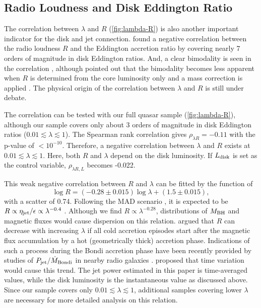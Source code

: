 \documentclass[preprint2,twocolappendix]{aastex6}
\begin{document}
\subsection{Radio Loudness and Disk Eddington Ratio}
\label{sec:R-lambda}

The correlation between $\lambda$ and $R$ (\autoref{fig:lambda-R}) is also another important indicator for the disk and jet connection. 
\citet{sik07} found a negative correlation between the radio loudness $R$ and the Eddington accretion ratio by covering nearly 7 orders of magnitude in disk Eddington ratios. And, a clear bimodality is seen in the correlation \citep{sik07}, although \citet{bro11} pointed out that the bimodality becomes less apparent when $R$ is determined from the core luminosity only and a mass correction is applied \citep[see also][]{gar14}. The physical origin of the correlation between $\lambda$ and $R$ is still under debate. 

The correlation can be tested with our full quasar sample (\autoref{fig:lambda-R}), although our sample covers only about 3 orders of magnitude in disk Eddington ratios ($0.01\lesssim\lambda\lesssim1$). The Spearman rank correlation gives $\rho_{\lambda R}=-0.11$ with the p-value of $<10^{-10}$. Therefore, a negative correlation between $\lambda$ and $R$ exists at $0.01\lesssim\lambda\lesssim1$. Here, both $R$ and $\lambda$ depend on the disk luminosity. If $L_{\rm disk}$ is set as the control variable, $\rho_{\lambda R, L}$ becomes -0.022. 

This weak negative correlation between $R$ and $\lambda$ can be fitted by the function of
\begin{equation}
\log R = (-0.28\pm0.015) \log \lambda + (1.5 \pm 0.015),
\end{equation}
with a scatter of 0.74. Following the MAD scenario \citep{nar03}, it is expected to be $R\propto \eta_{\rm jet}/\epsilon\propto\lambda^{-0.4}$ \citep{sik13}. Although we find $R\propto\lambda^{-0.28}$, distributions of $M_{\rm BH}$ and magnetic fluxes would cause dispersion on this relation. \citet{sik13} argued that $R$ can decrease with increasing $\lambda$ if all cold accretion episodes start after the magnetic flux accumulation by a hot (geometrically thick) accretion phase. Indications of such a process during the Bondi accretion phase have been recently provided by studies of $P_{\rm jet}/\dot{M}_{\rm Bondi}$ in nearby radio galaxies \citep{nem15}. \citet{rus16} proposed that time variation would cause this trend. The jet power estimated in this paper is time-averaged values, while the disk luminosity is the instantaneous value as discussed above. Since our sample covers only $0.01\lesssim\lambda\lesssim1$, additional samples covering lower $\lambda$ are necessary for more detailed analysis on this relation.
\end{document}
